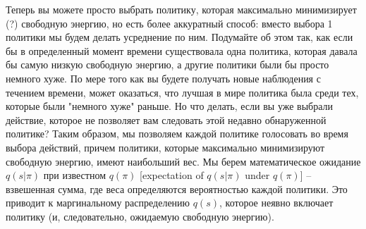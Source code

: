 \documentclass[twoside,leqno, 11pt]{article}
\begin{document}
	
	Теперь вы можете просто выбрать политику, которая максимально минимизирует (?) свободную энергию, но есть более аккуратный способ: вместо выбора 1 политики мы будем делать усреднение по ним. Подумайте об этом так, как если бы в определенный момент времени существовала одна политика, которая давала бы самую низкую свободную энергию, а другие политики были бы просто немного хуже. По мере того как вы будете получать новые наблюдения с течением времени, может оказаться, что лучшая в мире политика была среди тех, которые были "немного хуже" раньше. Но что делать, если вы уже выбрали действие, которое не позволяет вам следовать этой недавно обнаруженной политике? Таким образом, мы позволяем каждой политике голосовать во время выбора действий, причем политики, которые максимально минимизируют свободную энергию, имеют наибольший вес. Мы берем математическое ожидание $q(s|\pi)$ при известном $q(\pi)$ [expectation of $q(s|\pi)$ under $q(\pi)$] -- взвешенная сумма, где веса определяются вероятностью каждой политики. Это приводит к маргинальному распределению $q(s)$, которое неявно включает политику (и, следовательно, ожидаемую свободную энергию).
	
	\begin{figure}[h]
	\end{figure}
	
\end{document}
